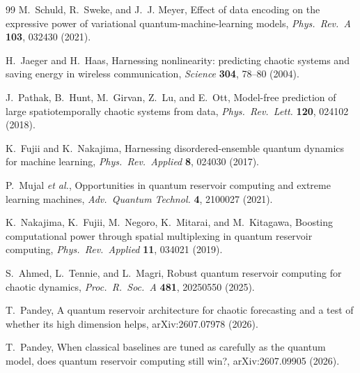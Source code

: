 \documentclass[a4paper,12pt]{iopart}
\begin{document}
\begin{thebibliography}{99}
M.~Schuld, R.~Sweke, and J.~J. Meyer,
Effect of data encoding on the expressive power of variational
quantum-machine-learning models,
\textit{Phys.\ Rev.\ A} \textbf{103}, 032430 (2021).

H.~Jaeger and H.~Haas,
Harnessing nonlinearity: predicting chaotic systems and saving energy in
wireless communication,
\textit{Science} \textbf{304}, 78--80 (2004).

J.~Pathak, B.~Hunt, M.~Girvan, Z.~Lu, and E.~Ott,
Model-free prediction of large spatiotemporally chaotic systems from data,
\textit{Phys.\ Rev.\ Lett.} \textbf{120}, 024102 (2018).

K.~Fujii and K.~Nakajima,
Harnessing disordered-ensemble quantum dynamics for machine learning,
\textit{Phys.\ Rev.\ Applied} \textbf{8}, 024030 (2017).

P.~Mujal \textit{et al.},
Opportunities in quantum reservoir computing and extreme learning machines,
\textit{Adv.\ Quantum Technol.} \textbf{4}, 2100027 (2021).

K.~Nakajima, K.~Fujii, M.~Negoro, K.~Mitarai, and M.~Kitagawa,
Boosting computational power through spatial multiplexing in quantum reservoir
computing,
\textit{Phys.\ Rev.\ Applied} \textbf{11}, 034021 (2019).

S.~Ahmed, L.~Tennie, and L.~Magri,
Robust quantum reservoir computing for chaotic dynamics,
\textit{Proc.\ R.\ Soc.\ A} \textbf{481}, 20250550 (2025).

T.~Pandey,
A quantum reservoir architecture for chaotic forecasting and a test of
whether its high dimension helps,
arXiv:2607.07978 (2026).

T.~Pandey,
When classical baselines are tuned as carefully as the quantum model, does
quantum reservoir computing still win?,
arXiv:2607.09905 (2026).

\end{thebibliography}
\end{document}

